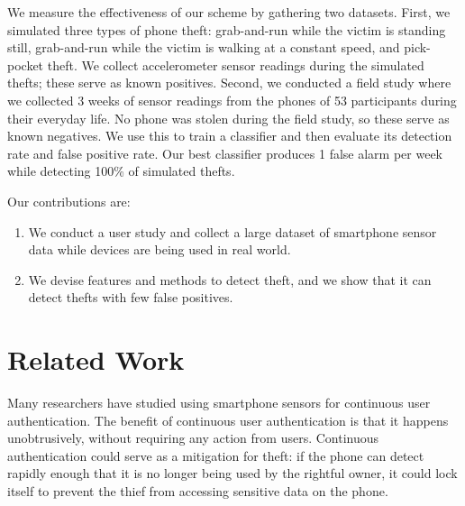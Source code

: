 \documentclass{soups}
\begin{document}
We measure the effectiveness of our scheme by gathering two datasets.
First, we simulated three types of phone theft: grab-and-run while the victim is standing still, grab-and-run while the victim is walking at a constant speed, and pick-pocket theft.
We collect accelerometer sensor readings during the simulated thefts; these serve as known positives.
Second, we conducted a field study where we collected 3 weeks of sensor readings from the phones of 53 participants during their everyday life.
No phone was stolen during the field study, so these serve as known negatives.
We use this to train a classifier and then evaluate its detection rate and false positive rate.
Our best classifier produces 1 false alarm per week while detecting 100\% of simulated thefts.


Our contributions are:
\begin{enumerate}
  \item We conduct a user study and collect a large dataset of smartphone sensor data while devices are being used in real world.
  \item We devise features and methods to detect theft, and we show that it can detect thefts with few false positives.
\end{enumerate}




\section{Related Work}

Many researchers have studied using smartphone sensors for continuous user authentication.
The benefit of continuous user authentication is that it happens unobtrusively, without requiring any action from users.
Continuous authentication could serve as a mitigation for theft: if the phone can detect rapidly enough that it is no longer being used by the rightful owner, it could lock itself to prevent the thief from accessing sensitive data on the phone.
\end{document}
